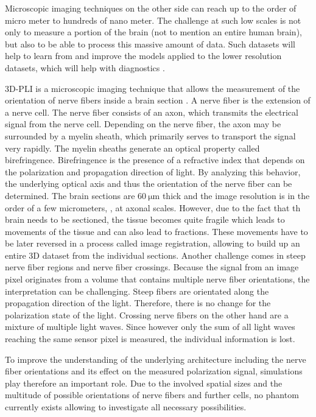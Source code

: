 Microscopic imaging techniques on the other side can reach up to the order of micro meter to hundreds of nano meter.
The challenge at such low scales is not only to measure a portion of the brain (not to mention an entire human brain), but also to be able to process this massive amount of data.
Such datasets will help to learn from and improve the models applied to the lower resolution datasets, which will help with \eg{} diagnostics \cite{Yendiki2021}.
\par
% 
\ac{3D-PLI} is a microscopic imaging technique that allows the measurement of the orientation of nerve fibers inside a brain section \cite{Axer2011a, Axer2011, Axer2016}.
A nerve fiber is the extension of a nerve cell.
The nerve fiber consists of an axon, which transmits the electrical signal from the nerve cell.
Depending on the nerve fiber, the axon may be surrounded by a myelin sheath, which primarily serves to transport the signal very rapidly.
The myelin sheaths generate an optical property called birefringence.
Birefringence is the presence of a refractive index that depends on the polarization and propagation direction of light.
By analyzing this behavior, the underlying optical axis and thus the orientation of the nerve fiber can be determined.
The brain sections are $\SI{60}{\micro\meter}$ thick and the image resolution is in the order of a few micrometers, \ie{}, at axonal scales.
However, due to the fact that th brain needs to be sectioned, the tissue becomes quite fragile which leads to movements of the tissue and can also lead to fractions.
These movements have to be later reversed in a process called image registration, allowing to build up an entire 3D dataset from the individual sections.
Another challenge comes in steep nerve fiber regions and nerve fiber crossings.
Because the signal from an image pixel originates from a volume that contains multiple nerve fiber orientations, the interpretation can be challenging.
Steep fibers are \eg{} orientated along the propagation direction of the light.
Therefore, there is no change for the polarization state of the light.
Crossing nerve fibers on the other hand are a mixture of multiple light waves.
Since however only the sum of all light waves reaching the same sensor pixel is measured, the individual information is lost.
\par
% 
To improve the understanding of the underlying architecture including the nerve fiber orientations and its effect on the measured polarization signal, simulations play therefore an important role.
Due to the involved spatial sizes and the multitude of possible orientations of nerve fibers and further cells, no phantom currently exists allowing to investigate all necessary possibilities.
